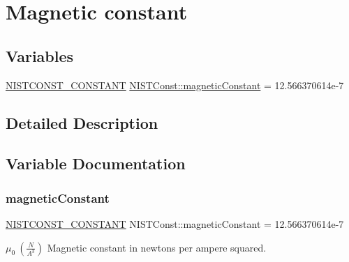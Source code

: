 \hypertarget{group___n_i_s_t_const-_magnetic_constant}{}\section{Magnetic constant}
\label{group___n_i_s_t_const-_magnetic_constant}
\subsection*{Variables}
\begin{DoxyCompactItemize}
\item 
\mbox{\hyperlink{group___n_i_s_t_const-_macros_ga2b0fc1d7452373f816175dd86ce26729}{N\+I\+S\+T\+C\+O\+N\+S\+T\+\_\+\+C\+O\+N\+S\+T\+A\+NT}} \mbox{\hyperlink{group___n_i_s_t_const-_magnetic_constant_gae78bada05f4e3438f6197ca595d9d09b}{N\+I\+S\+T\+Const\+::magnetic\+Constant}} = 12.\+566370614e-\/7
\end{DoxyCompactItemize}


\subsection{Detailed Description}


\subsection{Variable Documentation}
\mbox{\label{group___n_i_s_t_const-_magnetic_constant_gae78bada05f4e3438f6197ca595d9d09b}} 
\subsubsection{\texorpdfstring{magnetic\+Constant}{magneticConstant}}
{\footnotesize\ttfamily \mbox{\hyperlink{group___n_i_s_t_const-_macros_ga2b0fc1d7452373f816175dd86ce26729}{N\+I\+S\+T\+C\+O\+N\+S\+T\+\_\+\+C\+O\+N\+S\+T\+A\+NT}} N\+I\+S\+T\+Const\+::magnetic\+Constant = 12.\+566370614e-\/7}

$\mu_0 \ (\frac{N}{A^3})$ Magnetic constant in newtons per ampere squared. 